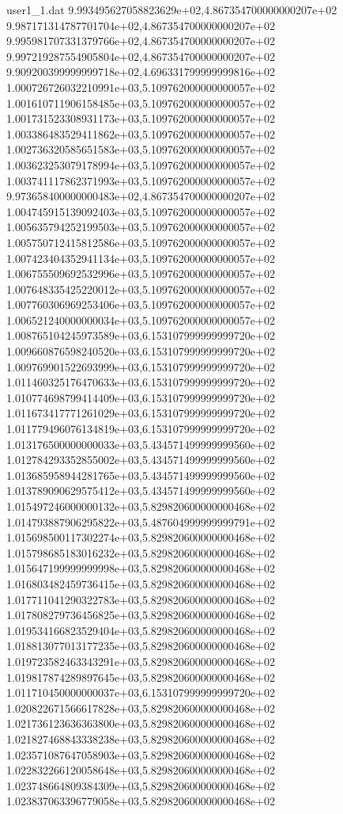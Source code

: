\begin{filecontents}{user1_1.dat}
9.993495627058823629e+02,4.867354700000000207e+02
9.987171314787701704e+02,4.867354700000000207e+02
9.995981707331379766e+02,4.867354700000000207e+02
9.997219287554905804e+02,4.867354700000000207e+02
9.909200399999999718e+02,4.696331799999999816e+02
1.000726726032210991e+03,5.109762000000000057e+02
1.001610711906158485e+03,5.109762000000000057e+02
1.001731523308931173e+03,5.109762000000000057e+02
1.003386483529411862e+03,5.109762000000000057e+02
1.002736320585651583e+03,5.109762000000000057e+02
1.003623253079178994e+03,5.109762000000000057e+02
1.003741117862371993e+03,5.109762000000000057e+02
9.973658400000000483e+02,4.867354700000000207e+02
1.004745915139092403e+03,5.109762000000000057e+02
1.005635794252199503e+03,5.109762000000000057e+02
1.005750712415812586e+03,5.109762000000000057e+02
1.007423404352941134e+03,5.109762000000000057e+02
1.006755509692532996e+03,5.109762000000000057e+02
1.007648335425220012e+03,5.109762000000000057e+02
1.007760306969253406e+03,5.109762000000000057e+02
1.006521240000000034e+03,5.109762000000000057e+02
1.008765104245973589e+03,6.153107999999999720e+02
1.009660876598240520e+03,6.153107999999999720e+02
1.009769901522693999e+03,6.153107999999999720e+02
1.011460325176470633e+03,6.153107999999999720e+02
1.010774698799414409e+03,6.153107999999999720e+02
1.011673417771261029e+03,6.153107999999999720e+02
1.011779496076134819e+03,6.153107999999999720e+02
1.013176500000000033e+03,5.434571499999999560e+02
1.012784293352855002e+03,5.434571499999999560e+02
1.013685958944281765e+03,5.434571499999999560e+02
1.013789090629575412e+03,5.434571499999999560e+02
1.015497246000000132e+03,5.829820600000000468e+02
1.014793887906295822e+03,5.487604999999999791e+02
1.015698500117302274e+03,5.829820600000000468e+02
1.015798685183016232e+03,5.829820600000000468e+02
1.015647199999999998e+03,5.829820600000000468e+02
1.016803482459736415e+03,5.829820600000000468e+02
1.017711041290322783e+03,5.829820600000000468e+02
1.017808279736456825e+03,5.829820600000000468e+02
1.019534166823529404e+03,5.829820600000000468e+02
1.018813077013177235e+03,5.829820600000000468e+02
1.019723582463343291e+03,5.829820600000000468e+02
1.019817874289897645e+03,5.829820600000000468e+02
1.011710450000000037e+03,6.153107999999999720e+02
1.020822671566617828e+03,5.829820600000000468e+02
1.021736123636363800e+03,5.829820600000000468e+02
1.021827468843338238e+03,5.829820600000000468e+02
1.023571087647058903e+03,5.829820600000000468e+02
1.022832266120058648e+03,5.829820600000000468e+02
1.023748664809384309e+03,5.829820600000000468e+02
1.023837063396779058e+03,5.829820600000000468e+02

\end{filecontents}
